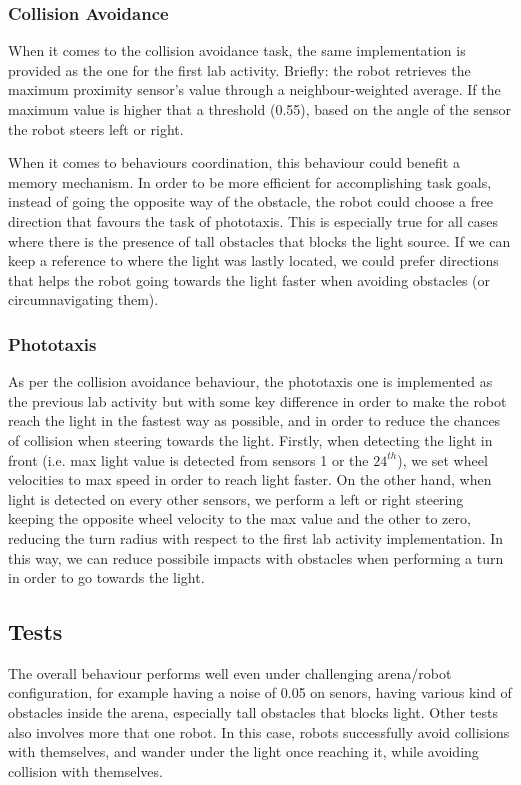 \subsubsection{Collision Avoidance}
When it comes to the collision avoidance task, the same implementation is
provided as the one for the first lab activity. Briefly: the robot retrieves
the maximum proximity sensor's value through a neighbour-weighted average. If
the maximum value is higher that a threshold (0.55), based on the angle of the
sensor the robot steers left or right.

When it comes to behaviours coordination, this behaviour could benefit a memory
mechanism. In order to be more efficient for accomplishing task goals, instead
of going the opposite way of the obstacle, the robot could choose a free
direction that favours the task of phototaxis. This is especially true for all
cases where there is the presence of tall obstacles that blocks the light
source. If we can keep a reference to where the light was lastly located, we
could prefer directions that helps the robot going towards the light faster
when avoiding obstacles (or circumnavigating them).

\subsubsection{Phototaxis}
As per the collision avoidance behaviour, the phototaxis one is implemented as
the previous lab activity but with some key difference in order to make the
robot reach the light in the fastest way as possible, and in order to reduce
the chances of collision when steering towards the light. Firstly, when
detecting the light in front (i.e. max light value is detected from sensors 1
or the $24^{th}$), we set wheel velocities to max speed in order to reach light
faster. On the other hand, when light is detected on every other sensors, we
perform a left or right steering keeping the opposite wheel velocity to the max
value and the other to zero, reducing the turn radius with respect to the first
lab activity implementation. In this way, we can reduce possibile impacts with
obstacles when performing a turn in order to go towards the light.


\subsection{Tests}\label{ssec:l2-test}
The overall behaviour performs well even under challenging arena/robot
configuration, for example having a noise of 0.05 on senors, having various
kind of obstacles inside the arena, especially tall obstacles that blocks
light. Other tests also involves more that one robot. In this case, robots
successfully avoid collisions with themselves, and wander under the light once
reaching it, while avoiding collision with themselves.

